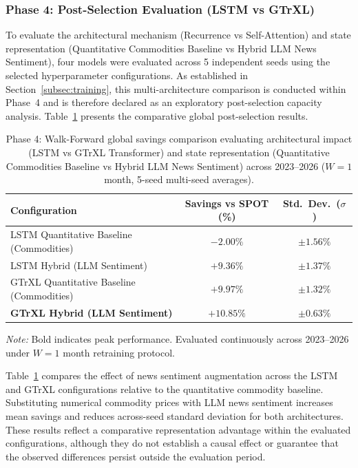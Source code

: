\subsubsection{Phase 4: Post-Selection Evaluation (LSTM vs GTrXL)}

To evaluate the architectural mechanism (Recurrence vs Self-Attention) and state representation (Quantitative Commodities Baseline vs Hybrid LLM News Sentiment), four models were evaluated across 5 independent seeds using the selected hyperparameter configurations. As established in Section~\ref{subsec:training}, this multi-architecture comparison is conducted within Phase~4 and is therefore declared as an exploratory post-selection capacity analysis. Table~\ref{tab:hpo_comparison} presents the comparative global post-selection results.

\begin{table}[htbp]
\centering
\footnotesize
\caption{Phase 4: Walk-Forward global savings comparison evaluating architectural impact (LSTM vs GTrXL Transformer) and state representation (Quantitative Commodities Baseline vs Hybrid LLM News Sentiment) across 2023--2026 ($W=1$ month, 5-seed multi-seed averages).}
\label{tab:hpo_comparison}
\begin{tabularx}{\columnwidth}{@{}Xcc@{}}
\toprule
\textbf{Configuration} & \textbf{Savings vs SPOT (\%)} & \textbf{Std.\ Dev.\ ($\sigma$)} \\
\midrule
LSTM Quantitative Baseline (Commodities) & $-2.00\%$ & $\pm 1.56\%$ \\
LSTM Hybrid (LLM Sentiment) & $+9.36\%$ & $\pm 1.37\%$ \\
GTrXL Quantitative Baseline (Commodities) & $+9.97\%$ & $\pm 1.32\%$ \\
\textbf{GTrXL Hybrid (LLM Sentiment)} & \textbf{$+10.85\%$} & \textbf{$\pm 0.63\%$} \\
\bottomrule
\end{tabularx}
\par\smallskip\raggedright\scriptsize \textit{Note:} Bold indicates peak performance. Evaluated continuously across 2023--2026 under $W=1$ month retraining protocol.
\end{table}

Table~\ref{tab:hpo_comparison} compares the effect of news sentiment augmentation across the LSTM and GTrXL configurations relative to the quantitative commodity baseline. Substituting numerical commodity prices with LLM news sentiment increases mean savings and reduces across-seed standard deviation for both architectures. These results reflect a comparative representation advantage within the evaluated configurations, although they do not establish a causal effect or guarantee that the observed differences persist outside the evaluation period.

